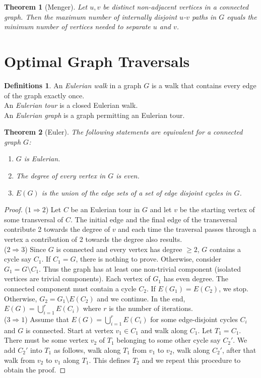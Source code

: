 \documentclass{article}
\newtheorem*{thm}{Theorem}
\theoremstyle{definition}
\newtheorem*{defns}{Definitions}
\begin{document}

\begin{thm}[Menger]
Let $u,v$ be distinct non-adjacent vertices in a connected graph.
Then the maximum number of internally disjoint $u$-$v$ paths in $G$ equals the minimum number of vertices needed to separate $u$ and $v$.
\end{thm}

\section{Optimal Graph Traversals}

\begin{defns}
An \emph{Eulerian walk} in a graph $G$ is a walk that contains every edge of the graph exactly once. \\
An \emph{Eulerian tour} is a closed Eulerian walk. \\
An \emph{Eulerian graph} is a graph permitting an Eulerian tour. \\
\end{defns}

\begin{thm}[Euler]
The following statements are equivalent for a connected graph $G$:
\begin{enumerate}
\item $G$ is Eulerian.
\item The degree of every vertex in $G$ is even.
\item $E(G)$ is the union of the edge sets of a set of edge disjoint cycles in $G$.
\end{enumerate}
\end{thm}

\begin{proof}
($1\Rightarrow 2$) Let $C$ be an Eulerian tour in $G$ and let $v$ be the starting vertex of some transversal of $C$.
The initial edge and the final edge of the transversal contribute 2 towards the degree of $v$ and each time the traversal passes through a vertex a contribution of 2 towards the degree also results. \\
($2\Rightarrow 3$) Since $G$ is connected and every vertex has degree $\ge 2$, $G$ contains a cycle say $C_1$.
If $C_1 = G$, there is nothing to prove.
Otherwise, consider $G_1=G\setminus C_1$.
Thus the graph has at least one non-trivial component (isolated vertices are trivial components).
Each vertex of $G_1$ has even degree.
The connected component must contain a cycle $C_2$.
If $E(G_1) = E(C_2)$, we stop.
Otherwise, $G_2 = G_1\setminus E(C_2)$ and we continue.
In the end, $E(G) = \bigcup_{i=1}^r E(C_i)$ where $r$ is the number of iterations. \\
($3\Rightarrow 1$) Assume that $E(G) = \bigcup_{i=1}^r E(C_i)$ for some edge-disjoint cycles $C_i$ and $G$ is connected.
Start at vertex $v_1\in C_1$ and walk along $C_1$.
Let $T_1 = C_1$.
There must be some vertex $v_2$ of $T_1$ belonging to some other cycle say $C_2'$.
We add $C_2'$ into $T_1$ as follows, walk along $T_1$ from $v_1$ to $v_2$, walk along $C_2'$, after that walk from $v_2$ to $v_1$ along $T_1$.
This defines $T_2$ and we repeat this procedure to obtain the proof.
\end{proof}
\end{document}
